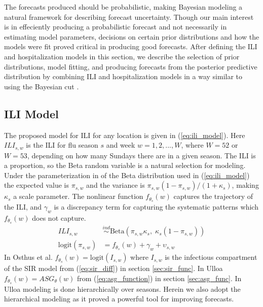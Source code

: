 The forecasts produced should be probabilistic, making Bayesian modeling a 
natural framework for describing forecast uncertainty. 
Though our main interest is in effeciently producing a probabilistic 
forecast and not 
necessarily in estimating model parameters, decisions on certain prior
distributions and how the models were fit proved critical in producing good 
forecasts. After defining the ILI and hospitalization models in this section, 
we describe the 
selection of prior distributions, model fitting, and producing forecasts
from the posterior predictive distribution by combining ILI and hospitalization
models in a way similar to using the 
Bayesian cut \cite[]{plummer2015cuts}.



\subsection{ILI Model} \label{sec:ili_model}

The proposed model for ILI for any location is given in (\ref{eq:ili_model}). 
Here $ILI_{s,w}$ is the ILI for flu season $s$ and week $w = 1, 2, ..., W$, 
where $W = 52$ or $W = 53$, depending on how many Sundays there are in a given 
season. The ILI is a proportion, so the Beta random variable is a natural 
selection for modeling. Under the parameterization in of the Beta distribution 
used in (\ref{eq:ili_model}) the expected value is $\pi_{s,w}$ and the 
variance is $\pi_{s,w}(1 - \pi_{s,w})/(1 + \kappa_s)$, making $\kappa_s$ a 
scale parameter. The nonlinear function $f_{\theta_s}(w)$ captures the 
trajectory of the ILI, and $\gamma_w$ is a discrepancy term for capturing the 
systematic patterns which $f_{\theta_s}(w)$ does not capture. 
\begin{equation}
\begin{aligned}
    \label{eq:ili_model}
        ILI_{s,w} &\overset{ind}{\sim} \text{Beta}(\pi_{s,w}\kappa_s,\; \kappa_s(1 - \pi_{s,w})) \\
        \text{logit}(\pi_{s,w}) &= f_{\theta_s}(w) + \gamma_w + \upsilon_{s,w}
\end{aligned}
\end{equation}
In Osthus et al. \cite[]{osthus2019dynamic} 
$f_{\theta_s}(w) = \text{logit}(I_{s,w})$ where $I_{s,w}$ is the infectious 
compartment of the SIR model from (\ref{eq:sir_diff}) in section 
\ref{sec:sir_func}. In Ulloa \cite[]{ulloa2019} 
$f_{\theta_s}(w) = ASG_{\theta}(w)$ from (\ref{eq:asg_function}) in section 
\ref{sec:asg_func}. In Ulloa \cite[]{ulloa2019} modeling is done hierarchically 
over seasons. Herein we also adopt the hierarchical modeling as it proved a 
powerful tool for improving forecasts.

